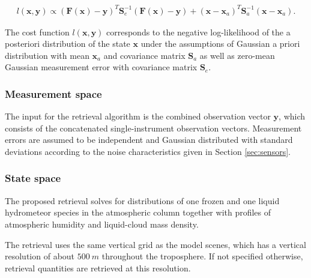 \documentclass[journal abbreviation, manuscript]{copernicus}
\begin{document}
\begin{align}
l(\mathbf{x}, \mathbf{y}) \propto
 \left(\mathbf{F}(\mathbf{x}) - \mathbf{y} \right )^T
  \mathbf{S}_e^{-1} 
  \left ( \mathbf{F}(\mathbf{x}) - \mathbf{y} \right)
+ \left ( \mathbf{x} - \mathbf{x}_a \right )^T
 \mathbf{S}^{-1}_a 
 \left ( \mathbf{x} - \mathbf{x}_a \right ).
\end{align}

The cost function $l(\mathbf{x}, \mathbf{y})$ corresponds to the negative
log-likelihood of the a posteriori distribution of the state $\mathbf{x}$
under the assumptions of Gaussian a priori distribution with mean
$\mathbf{x}_a$ and covariance matrix $\mathbf{S}_a$ as well as zero-mean Gaussian
measurement error with covariance
matrix $\mathbf{S}_e$.

\subsubsection{Measurement space}
\label{sec:orge7dc286}

The input for the retrieval algorithm is the combined observation vector
$\mathbf{y}$, which consists of the concatenated single-instrument observation
vectors. Measurement errors are assumed to be independent and Gaussian distributed
with standard deviations according to the noise characteristics given in Section
\ref{sec:sensors}. 

\subsubsection{State space}
\label{sec:orgae5ee4e}

The proposed retrieval solves for distributions of one frozen and one liquid
hydrometeor species in the atmospheric column together with profiles of
atmospheric humidity and liquid-cloud mass density.

The retrieval uses the same vertical grid as the model scenes, which has a
vertical resolution of about $500\ \unit{m}$ throughout the troposphere. If not
specified otherwise, retrieval quantities are retrieved at this resolution.
\end{document}

